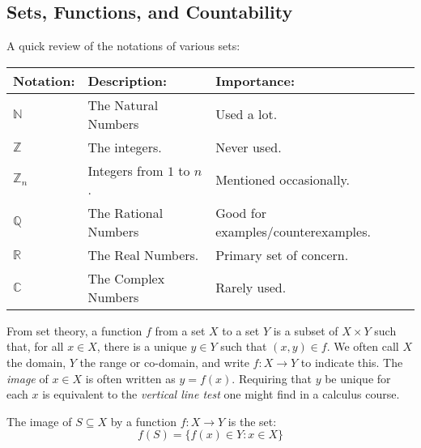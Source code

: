 \documentclass[crop=false,class=book,oneside]{standalone}
\begin{document}
        \subsection{Sets, Functions, and Countability}
            A quick review of the notations of various sets:
            \begin{table}[H]
                \centering
                \begin{tabular}{|l|l|l|}
                    \hline
                    Notation:&Description:&Importance:\\
                    \hline
                    $\mathbb{N}$&The Natural Numbers
                    &Used a lot.\\
                    \hline
                    $\mathbb{Z}$&The integers.&Never used.\\
                    \hline
                    $\mathbb{Z}_{n}$&Integers from $1$ to $n$.
                    &Mentioned occasionally.\\
                    \hline
                    $\mathbb{Q}$&The Rational Numbers&
                    Good for examples/counterexamples.\\
                    \hline
                    $\mathbb{R}$&The Real Numbers.&
                    Primary set of concern.\\
                    \hline
                    $\mathbb{C}$&The Complex Numbers&
                    Rarely used.\\
                    \hline
                \end{tabular}
            \end{table}
            From set theory, a function $f$ from a set $X$ to a
            set $Y$ is a subset of $X\times{Y}$ such that, for
            all $x\in{X}$, there is a unique $y\in{Y}$
            such that $(x,y)\in{f}$. We often call $X$ the
            domain, $Y$ the range or co-domain, and write
            $f:X\rightarrow{Y}$ to indicate this. The
            \textit{image} of $x\in{X}$ is often written
            as $y=f(x)$. Requiring that $y$ be unique for each
            $x$ is equivalent to the \textit{vertical line test}
            one might find in a calculus course.
            \begin{definition}
                The image of $S\subseteq{X}$
                by a function $f:X\rightarrow{Y}$
                is the set:
                \begin{equation}
                    f(S)=\{f(x)\in{Y}:x\in{X}\}
                \end{equation}
            \end{definition}
\end{document}
